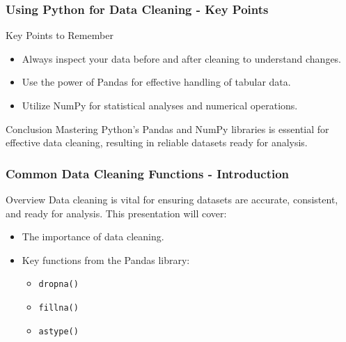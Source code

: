 \documentclass[aspectratio=169]{beamer}
\begin{document}
\begin{frame}
    \frametitle{Using Python for Data Cleaning - Key Points}
    \begin{block}{Key Points to Remember}
        \begin{itemize}
            \item Always inspect your data before and after cleaning to understand changes.
            \item Use the power of Pandas for effective handling of tabular data.
            \item Utilize NumPy for statistical analyses and numerical operations.
        \end{itemize}
    \end{block}
    \begin{block}{Conclusion}
        Mastering Python's Pandas and NumPy libraries is essential for effective data cleaning, resulting in reliable datasets ready for analysis.
    \end{block}
\end{frame}

\begin{frame}[fragile]
    \frametitle{Common Data Cleaning Functions - Introduction}
    \begin{block}{Overview}
        Data cleaning is vital for ensuring datasets are accurate, consistent, and ready for analysis. This presentation will cover:
    \end{block}
    \begin{itemize}
        \item The importance of data cleaning.
        \item Key functions from the Pandas library:
        \begin{itemize}
            \item \texttt{dropna()}
            \item \texttt{fillna()}
            \item \texttt{astype()}
        \end{itemize}
    \end{itemize}
\end{frame}
\end{document}
